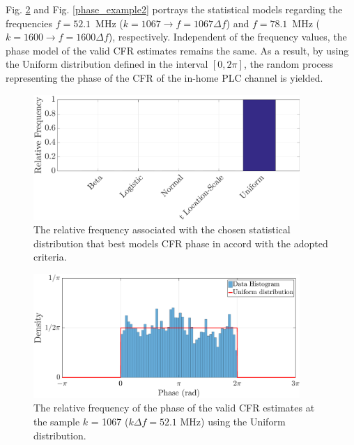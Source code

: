 Fig. \ref{phase_example} and Fig. \ref{phase_example2} portrays the statistical models regarding the frequencies $f=52.1$~MHz ($k=1067 \rightarrow f = 1067\Delta f$) and $f=78.1$~MHz ($k=1600 \rightarrow f = 1600\Delta f$), respectively. Independent of the frequency values, the phase model of the valid \ac{CFR} estimates remains the same. As a result, by using the Uniform distribution defined in the interval $[0, 2\pi]$, the random process representing the phase of the \ac{CFR} of the in-home \ac{PLC} channel is yielded.

\begin{figure}[h!]
	\centering
	\includegraphics[width=0.9\textwidth]{images/Phase_percent.eps}
	\caption{The relative frequency associated with the chosen statistical distribution that best models CFR phase in accord with the adopted criteria.}
	\label{Phase_percent}
\end{figure}

\begin{figure}[h!]
	\centering
	\includegraphics[width=0.9\textwidth]{images/Phase_hist_2.eps}
	\caption{The relative frequency of the phase of the valid CFR estimates at the sample $k$ = 1067 ($k\Delta f= 52.1$ MHz) using the Uniform distribution.}
	\label{phase_example}
\end{figure}

